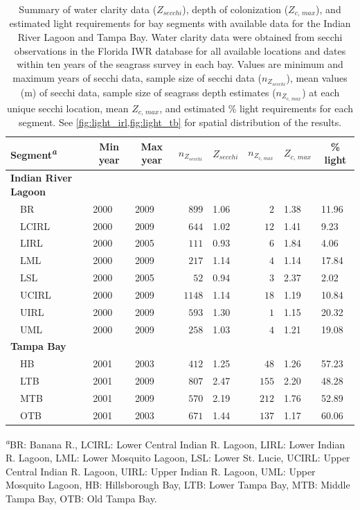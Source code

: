 \documentclass[letterpaper,12pt,oneside]{article}\usepackage[]{graphicx}\usepackage[]{color}
\begin{document}
\begin{table}[!tbp]
\caption{Summary of water clarity data ($Z_{secchi}$), depth of colonization ($Z_{c,\,max}$), and estimated light requirements for bay segments with available data for the Indian River Lagoon and Tampa Bay.  Water clarity data were obtained from secchi observations in the Florida \acl{IWR} database for all available locations and dates within ten years of the seagrass survey in each bay.  Values are minimum and maximum years of secchi data, sample size of secchi data ($n_{Z_{secchi}}$), mean values (m) of secchi data, sample size of seagrass depth estimates ($n_{Z_{c,\,max}}$) at each unique secchi location, mean $Z_{c,\,max}$, and estimated \% light requirements for each segment.  See \cref{fig:light_irl,fig:light_tb} for spatial distribution of the results.\label{tab:secc_summ}} 
\begin{center}
\begin{tabular}{lllrlrll}
\hline\hline
\multicolumn{1}{l}{Segment\textsuperscript{\textit{a}}}&\multicolumn{1}{c}{Min year}&\multicolumn{1}{c}{Max year}&\multicolumn{1}{c}{$n_{Z_{secchi}}$}&\multicolumn{1}{c}{$Z_{secchi}$}&\multicolumn{1}{c}{$n_{Z_{c,\,max}}$}&\multicolumn{1}{c}{$Z_{c,\,max}$}&\multicolumn{1}{c}{\% light}\tabularnewline
\hline
{\bfseries Indian River Lagoon}&&&&&&&\tabularnewline
~~BR&2000&2009&$ 899$&1.06&$  2$&1.38&11.96\tabularnewline
~~LCIRL&2000&2009&$ 644$&1.02&$ 12$&1.41& 9.23\tabularnewline
~~LIRL&2000&2005&$ 111$&0.93&$  6$&1.84& 4.06\tabularnewline
~~LML&2000&2009&$ 217$&1.14&$  4$&1.14&17.84\tabularnewline
~~LSL&2000&2005&$  52$&0.94&$  3$&2.37& 2.02\tabularnewline
~~UCIRL&2000&2009&$1148$&1.14&$ 18$&1.19&10.84\tabularnewline
~~UIRL&2000&2009&$ 593$&1.30&$  1$&1.15&20.32\tabularnewline
~~UML&2000&2009&$ 258$&1.03&$  4$&1.21&19.08\tabularnewline
\hline
{\bfseries Tampa Bay}&&&&&&&\tabularnewline
~~HB&2001&2003&$ 412$&1.25&$ 48$&1.26&57.23\tabularnewline
~~LTB&2001&2009&$ 807$&2.47&$155$&2.20&48.28\tabularnewline
~~MTB&2001&2009&$ 570$&2.19&$212$&1.76&52.89\tabularnewline
~~OTB&2001&2003&$ 671$&1.44&$137$&1.17&60.06\tabularnewline
\hline
\end{tabular}\end{center}

\textsuperscript{\textit{a}}\footnotesize BR: Banana R., LCIRL: Lower Central Indian R. Lagoon, LIRL: Lower Indian R. Lagoon, LML: Lower Mosquito Lagoon, LSL: Lower St. Lucie, UCIRL: Upper Central Indian R. Lagoon, UIRL: Upper Indian R. Lagoon, UML: Upper Mosquito Lagoon, HB: Hillsborough Bay, LTB: Lower Tampa Bay, MTB: Middle Tampa Bay, OTB: Old Tampa Bay.\end{table}
\end{document}
